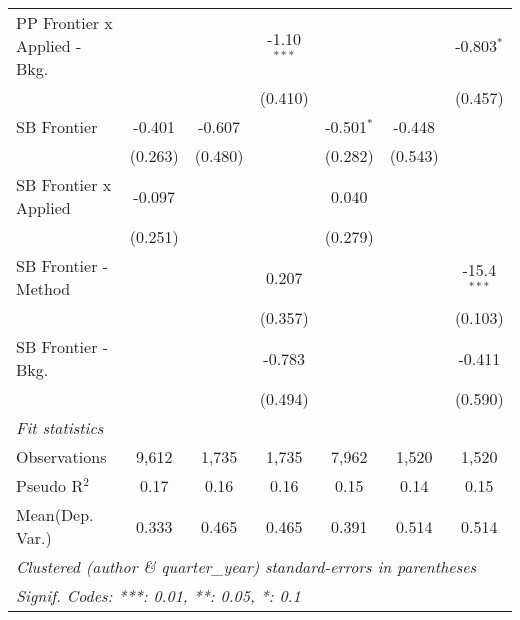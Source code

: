 \begin{tabular}{lcccccc}
   PP Frontier x Applied - Bkg.   &                &                & -1.10$^{***}$  &                &                & -0.803$^{*}$\\   
                                  &                &                & (0.410)        &                &                & (0.457)\\   
   SB Frontier                    & -0.401         & -0.607         &                & -0.501$^{*}$   & -0.448         &   \\   
                                  & (0.263)        & (0.480)        &                & (0.282)        & (0.543)        &   \\   
   SB Frontier x Applied          & -0.097         &                &                & 0.040          &                &   \\   
                                  & (0.251)        &                &                & (0.279)        &                &   \\   
   SB Frontier - Method           &                &                & 0.207          &                &                & -15.4$^{***}$\\   
                                  &                &                & (0.357)        &                &                & (0.103)\\   
   SB Frontier - Bkg.             &                &                & -0.783         &                &                & -0.411\\   
                                  &                &                & (0.494)        &                &                & (0.590)\\   
   \midrule
   \emph{Fit statistics}\\
   Observations                   & 9,612          & 1,735          & 1,735          & 7,962          & 1,520          & 1,520\\  
   Pseudo R$^2$                   & 0.17           & 0.16           & 0.16           & 0.15           & 0.14           & 0.15\\  
Mean(Dep. Var.) & 0.333 & 0.465 & 0.465 & 0.391 & 0.514 & 0.514 \\
   \midrule \midrule
   \multicolumn{7}{l}{\emph{Clustered (author \& quarter\_year) standard-errors in parentheses}}\\
   \multicolumn{7}{l}{\emph{Signif. Codes: ***: 0.01, **: 0.05, *: 0.1}}\\
\end{tabular}
\par\endgroup
